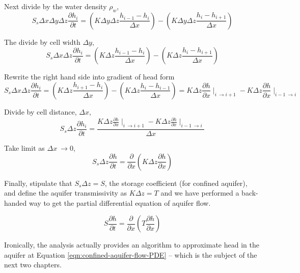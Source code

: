 Next divide by the water density $\rho_{w}$,
 \begin{equation}
S_{s} \Delta x \Delta y \Delta z \frac{\partial h_i}{\partial t} = 
(K \Delta y \Delta z \frac{h_{i-1} - h_{i}}{\Delta x}) - 
(K \Delta y \Delta z \frac{h_{i} - h_{i+1}}{\Delta x})
\label{eqn:finite-difference-structure}
\end{equation}

The divide by cell width $\Delta y $,
 \begin{equation}
S_{s} \Delta x \Delta z \frac{\partial h_i}{\partial t} = 
(K  \Delta z \frac{h_{i-1} - h_{i}}{\Delta x}) - 
(K  \Delta z \frac{h_{i} - h_{i+1}}{\Delta x})
\end{equation}

Rewrite the right hand side into gradient of head form
 \begin{equation}
S_{s} \Delta x \Delta z \frac{\partial h_i}{\partial t} = 
(K \Delta z \frac{h_{i+1} - h_{i}}{\Delta x}) - 
(K \Delta z \frac{h_{i} - h_{i-1}}{\Delta x})
= 
{K \Delta z \frac{\partial h}{\partial x}}\mid_{i~\rightarrow i+1} -
{K \Delta z \frac{\partial h}{\partial x}}\mid_{i-1~\rightarrow i}
\end{equation}

Divide by cell distance, $\Delta x$,
 \begin{equation}
S_{s}  \Delta z \frac{\partial h_i}{\partial t} = 
\frac{{K \Delta z \frac{\partial h}{\partial x}}\mid_{i~\rightarrow i+1} -
{K \Delta z\frac{\partial h}{\partial x}}\mid_{i-1~\rightarrow i}}{\Delta x}
\end{equation}

Take limit as $\Delta x~\rightarrow0$, 
\begin{equation}
S_{s} \Delta z  \frac{\partial h}{\partial t} = 
\frac{\partial}{\partial x}({K \Delta z \frac{\partial h}{\partial x}})
\end{equation}

Finally, stipulate that $S_{s} \Delta z = S$, the storage coefficient (for confined aquifer), and define the aquifer transmissivity as $K \Delta z = T$ and we have performed a back-handed way to get the partial differential equation of aquifer flow.  

\begin{equation}
S \frac{\partial h}{\partial t} = 
\frac{\partial}{\partial x}({T \frac{\partial h}{\partial x}})
\label{eqn:confined-aquifer-flow-PDE}
\end{equation}

Ironically, the analysis actually provides an algorithm to approximate head in the aquifer at Equation \ref{eqn:confined-aquifer-flow-PDE} -- which is the subject of the next two chapters.

